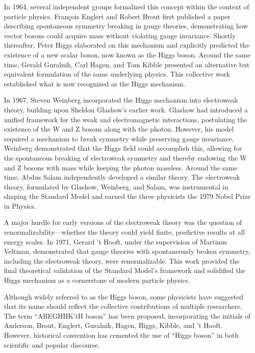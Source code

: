 In 1964, several independent groups formalized this concept within the context of particle physics. François Englert and Robert Brout first published a paper describing spontaneous symmetry breaking in gauge theories, demonstrating how vector bosons could acquire mass without violating gauge invariance. Shortly thereafter, Peter Higgs elaborated on this mechanism and explicitly predicted the existence of a new scalar boson, now known as the Higgs boson. Around the same time, Gerald Guralnik, Carl Hagen, and Tom Kibble presented an alternative but equivalent formulation of the same underlying physics. This collective work established what is now recognized as the Higgs mechanism.

In 1967, Steven Weinberg incorporated the Higgs mechanism into electroweak theory, building upon Sheldon Glashow’s earlier work. Glashow had introduced a unified framework for the weak and electromagnetic interactions, postulating the existence of the W and Z bosons along with the photon. However, his model required a mechanism to break symmetry while preserving gauge invariance. Weinberg demonstrated that the Higgs field could accomplish this, allowing for the spontaneous breaking of electroweak symmetry and thereby endowing the W and Z bosons with mass while keeping the photon massless. Around the same time, Abdus Salam independently developed a similar theory. The electroweak theory, formulated by Glashow, Weinberg, and Salam, was instrumental in shaping the Standard Model and earned the three physicists the 1979 Nobel Prize in Physics.

A major hurdle for early versions of the electroweak theory was the question of renormalizability—whether the theory could yield finite, predictive results at all energy scales. In 1971, Gerard ’t Hooft, under the supervision of Martinus Veltman, demonstrated that gauge theories with spontaneously broken symmetry, including the electroweak theory, were renormalizable. This work provided the final theoretical validation of the Standard Model’s framework and solidified the Higgs mechanism as a cornerstone of modern particle physics.

Although widely referred to as the Higgs boson, some physicists have suggested that its name should reflect the collective contributions of multiple researchers. The term ``ABEGHHK’tH boson'' has been proposed, incorporating the initials of Anderson, Brout, Englert, Guralnik, Hagen, Higgs, Kibble, and ’t Hooft. However, historical convention has cemented the use of “Higgs boson” in both scientific and popular discourse.

